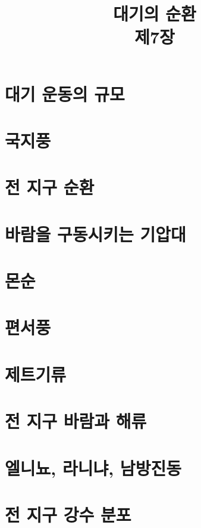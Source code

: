 \title[]{대기의 순환\\\small{제7장}}

\begin{frame}[plain] %
	\titlepage
\end{frame}


\section{대기 운동의 규모}


\section{국지풍}

\section{전 지구 순환}

\section{바람을 구동시키는 기압대}

\section{몬순}

\section{편서풍}

\section{제트기류}

\section{전 지구 바람과 해류}

\section{엘니뇨, 라니냐, 남방진동}

\section{전 지구 강수 분포}


